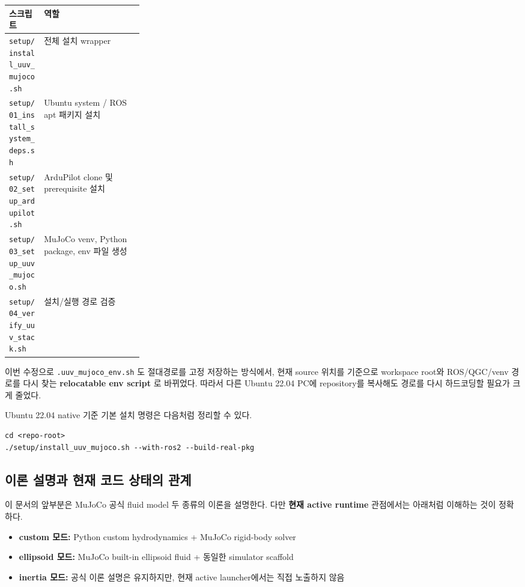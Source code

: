 \documentclass[11pt,a4paper]{article}
\newcommand{\code}[1]{\nolinkurl{#1}}
\begin{document}
\begin{center}
\small
\begin{tabularx}{\linewidth}{>{\raggedright\arraybackslash}p{0.26\linewidth}Y}
\toprule
스크립트 & 역할 \\
\midrule
\code{setup/install\_uuv\_mujoco.sh} & 전체 설치 wrapper \\
\code{setup/01\_install\_system\_deps.sh} & Ubuntu system / ROS apt 패키지 설치 \\
\code{setup/02\_setup\_ardupilot.sh} & ArduPilot clone 및 prerequisite 설치 \\
\code{setup/03\_setup\_uuv\_mujoco.sh} & MuJoCo venv, Python package, env 파일 생성 \\
\code{setup/04\_verify\_uuv\_stack.sh} & 설치/실행 경로 검증 \\
\bottomrule
\end{tabularx}
\end{center}

이번 수정으로 \code{.uuv\_mujoco\_env.sh} 도 절대경로를 고정 저장하는 방식에서, 현재 source 위치를 기준으로 workspace root와 ROS/QGC/venv 경로를 다시 찾는 \textbf{relocatable env script} 로 바뀌었다. 따라서 다른 Ubuntu 22.04 PC에 repository를 복사해도 경로를 다시 하드코딩할 필요가 크게 줄었다.

Ubuntu 22.04 native 기준 기본 설치 명령은 다음처럼 정리할 수 있다.

\begin{verbatim}
cd <repo-root>
./setup/install_uuv_mujoco.sh --with-ros2 --build-real-pkg
\end{verbatim}

\subsection{이론 설명과 현재 코드 상태의 관계}

이 문서의 앞부분은 MuJoCo 공식 fluid model 두 종류의 이론을 설명한다. 다만 \textbf{현재 active runtime} 관점에서는 아래처럼 이해하는 것이 정확하다.

\begin{itemize}[leftmargin=2em]
  \item \textbf{custom 모드:} Python custom hydrodynamics + MuJoCo rigid-body solver
  \item \textbf{ellipsoid 모드:} MuJoCo built-in ellipsoid fluid + 동일한 simulator scaffold
  \item \textbf{inertia 모드:} 공식 이론 설명은 유지하지만, 현재 active launcher에서는 직접 노출하지 않음
\end{itemize}
\end{document}
